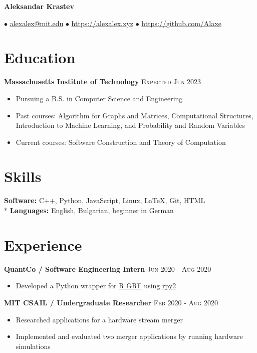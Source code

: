 \documentclass[letterpaper,11pt]{article}
\author{Aleksandar Krastev}
\date{2019-09-03}
\newcommand{\noskip}{\vspace{-\parskip}}
\begin{document}
\setlength{\belowdisplayskip}{\parskip}
\setlength{\belowdisplayshortskip}{\belowdisplayskip}
\setlength{\abovedisplayskip}{\parskip}
\setlength{\abovedisplayshortskip}{\abovedisplayskip}


\centerline{{\Huge \bf Aleksandar Krastev}}
$\bullet$ \href{mailto:alexalex@mit.edu}{alexalex@mit.edu} \hfill
$\bullet$ \href{https://alexalex.xyz}{https://alexalex.xyz} \hfill
$\bullet$ \href{https://github.com/Alaxe}{https://github.com/Alaxe} \hfill

\noskip
\section*{Education}
\textbf{Massachusetts Institute of Technology}
\hfill
\textsc{Expected Jun 2023}

\noskip
\begin{itemize}
    \item Pursuing a B.S. in Computer Science and Engineering
    \item Past courses:
        Algorithm for Graphs and Matrices,
        Computational Structures,
        Introduction to Machine Learning,
        and Probability and Random Variables
    \item Current courses:
        Software Construction and Theory of Computation
\end{itemize}

\section*{Skills}
\textbf{Software:} C++, Python, JavaScript, Linux, LaTeX, Git, HTML\\*
\textbf{Languages:} English, Bulgarian, beginner in German

\section*{Experience}
\textbf{QuantCo / Software Engineering Intern}
\hfill
\textsc{Jun 2020 - Aug 2020}
\noskip
\begin{itemize}
    \item Developed a Python wrapper for
        \href{https://grf-labs.github.io/}{R GRF} using
        \href{https://rpy2.github.io/}{rpy2}
\end{itemize}

\textbf{MIT CSAIL / Undergraduate Researcher}
\hfill
\textsc{Feb 2020 - Aug 2020}
\noskip
\begin{itemize}
    \item Researched applications for a hardware stream merger
    \item Implemented and evaluated two merger applications by running hardware
        simulations
\end{itemize}
\end{document}
